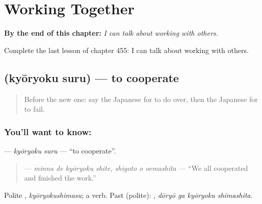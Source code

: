 
\chapter{Working Together}
\label{ch:ja-working-together}

\begin{chapteropening}
\textbf{By the end of this chapter:} \emph{I can talk about working with others.}

Complete the last lesson of chapter 455: I can talk about working with others.
\end{chapteropening}

\section[\texorpdfstring{\ja{きょうりょくする} (kyōryoku suru)}{きょうりょくする (kyōryoku suru)}]{ (kyōryoku suru) — to cooperate}

\label{lesson:JA-C455-kyouryoku-suru}



\begin{quote}
Before the new one: say the Japanese for to do over, then the Japanese for to fail.
\end{quote}

\subsection*{You'll want to know: }
\textbf{} — \emph{kyōryoku suru} — \textquotedblleft{}to cooperate\textquotedblright{}.

\begin{quote}
\textbf{  } — \emph{minna de kyōryoku shite, shigoto o oemashita} — \textquotedblleft{}We all cooperated and finished the work.\textquotedblright{}
\end{quote}

Polite \textbf{}, \emph{kyōryokushimasu}; a  verb. Past (polite): \textbf{ }, \emph{dōryō ga kyōryoku shimashita}.

